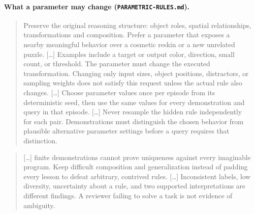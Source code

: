 \documentclass[11pt]{article}
\begin{document}
\paragraph{What a parameter may change (\texttt{PARAMETRIC-RULES.md}).}
\begin{quote}\small
Preserve the original reasoning structure: object roles, spatial
relationships, transformations and composition. Prefer a parameter that
exposes a nearby meaningful behavior over a cosmetic reskin or a new unrelated
puzzle. [\dots] Examples include a target or output color, direction, small
count, or threshold. The parameter must change the executed transformation.
Changing only input sizes, object positions, distractors, or sampling weights
does not satisfy this request unless the actual rule also changes. [\dots]
Choose parameter values once per episode from its deterministic seed, then use
the same values for every demonstration and query in that episode. [\dots]
Never resample the hidden rule independently for each pair. Demonstrations
must distinguish the chosen behavior from plausible alternative parameter
settings before a query requires that distinction.
\end{quote}
\begin{quote}\small
[\dots] finite demonstrations cannot prove uniqueness against every imaginable
program. Keep difficult composition and generalization instead of padding every
lesson to defeat arbitrary, contrived rules. [\dots] Inconsistent labels, low
diversity, uncertainty about a rule, and two supported interpretations are
different findings. A reviewer failing to solve a task is not evidence of
ambiguity.
\end{quote}
\end{document}
